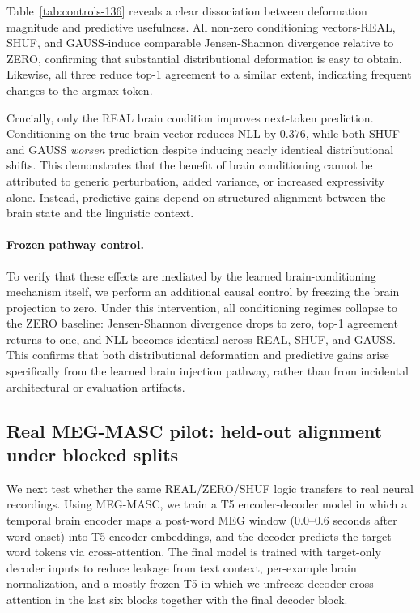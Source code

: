 \documentclass{article}
\theoremstyle{plain}
\theoremstyle{definition}
\theoremstyle{remark}
\begin{document}
Table~\ref{tab:controls-136} reveals a clear dissociation between deformation magnitude and predictive usefulness.
All non-zero conditioning vectors-REAL, SHUF, and GAUSS-induce comparable Jensen-Shannon divergence relative to ZERO, confirming that substantial distributional deformation is easy to obtain.
Likewise, all three reduce top-1 agreement to a similar extent, indicating frequent changes to the argmax token.

Crucially, only the REAL brain condition improves next-token prediction.
Conditioning on the true brain vector reduces NLL by $0.376$, while both SHUF and GAUSS \emph{worsen} prediction despite inducing nearly identical distributional shifts.
This demonstrates that the benefit of brain conditioning cannot be attributed to generic perturbation, added variance, or increased expressivity alone.
Instead, predictive gains depend on structured alignment between the brain state and the linguistic context.

\paragraph{Frozen pathway control.}
To verify that these effects are mediated by the learned brain-conditioning mechanism itself, we perform an additional causal control by freezing the brain projection to zero.
Under this intervention, all conditioning regimes collapse to the ZERO baseline: Jensen-Shannon divergence drops to zero, top-1 agreement returns to one, and NLL becomes identical across REAL, SHUF, and GAUSS.
This confirms that both distributional deformation and predictive gains arise specifically from the learned brain injection pathway, rather than from incidental architectural or evaluation artifacts.

\subsection{Real MEG-MASC pilot: held-out alignment under blocked splits}
\label{sec:megmasc_pilot}

We next test whether the same REAL/ZERO/SHUF logic transfers to real neural recordings.
Using MEG-MASC, we train a T5 encoder-decoder model in which a temporal brain encoder maps a post-word MEG window ($0.0$--$0.6$ seconds after word onset) into T5 encoder embeddings, and the decoder predicts the target word tokens via cross-attention.
The final model is trained with target-only decoder inputs to reduce leakage from text context, per-example brain normalization, and a mostly frozen T5 in which we unfreeze decoder cross-attention in the last six blocks together with the final decoder block.
\end{document}

